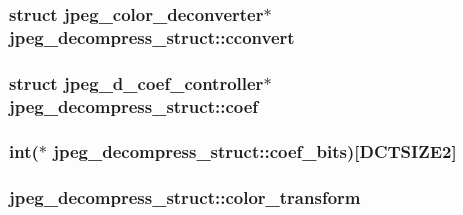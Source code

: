 \subsubsection[{cconvert}]{\setlength{\rightskip}{0pt plus 5cm}struct {\bf jpeg\+\_\+color\+\_\+deconverter}$\ast$ jpeg\+\_\+decompress\+\_\+struct\+::cconvert}\label{structjpeg__decompress__struct_a1f88347e58f8f9d93954aa885f3497fb}
\hypertarget{structjpeg__decompress__struct_a25ff493a838c250917bf874a70bdb6f2}{}
\subsubsection[{coef}]{\setlength{\rightskip}{0pt plus 5cm}struct {\bf jpeg\+\_\+d\+\_\+coef\+\_\+controller}$\ast$ jpeg\+\_\+decompress\+\_\+struct\+::coef}\label{structjpeg__decompress__struct_a25ff493a838c250917bf874a70bdb6f2}
\hypertarget{structjpeg__decompress__struct_a61c024a1b3f2bc0b32ff7c3145ac7f2c}{}
\subsubsection[{coef\+\_\+bits}]{\setlength{\rightskip}{0pt plus 5cm}int($\ast$ jpeg\+\_\+decompress\+\_\+struct\+::coef\+\_\+bits)\mbox{[}{\bf D\+C\+T\+S\+I\+Z\+E2}\mbox{]}}\label{structjpeg__decompress__struct_a61c024a1b3f2bc0b32ff7c3145ac7f2c}
\hypertarget{structjpeg__decompress__struct_a976c199570f66a35853ad08dac014bc3}{}
\subsubsection[{color\+\_\+transform}]{ jpeg\+\_\+decompress\+\_\+struct\+::color\+\_\+transform}\label{structjpeg__decompress__struct_a976c199570f66a35853ad08dac014bc3}
\hypertarget{structjpeg__decompress__struct_a29fac0bebc292e40b83631b9861c7ab8}{}
